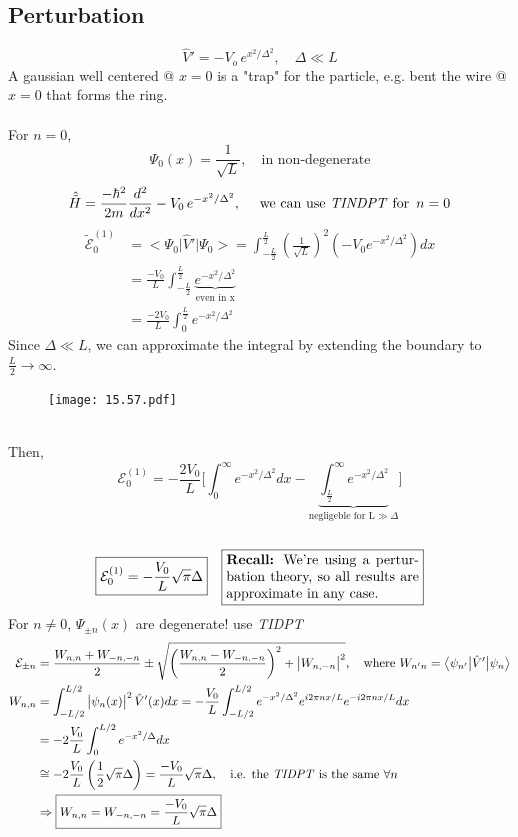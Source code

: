 \documentclass[12pt,fancychapters]{report}
\numberwithin{equation}{section}
\begin{document}
\subsection*{Perturbation}
\[
  \hat{V}' = -V_o\,e^{x^2/\Delta^2}, \quad \Delta \ll L
\]
A gaussian well centered @ $x=0$ is a "trap" for the particle, e.g. bent the wire @ $x=0$ that
forms the ring. \\
\\
For $n= 0$,
\[
  \Psi_0(x) = \frac{1}{\sqrt{L}}, \quad \text{in non-degenerate}
\]
\[
  \hat{ \tilde{H}} = \frac{-\hbar^2}{2m}\frac{d^2}{dx^2} - V_0\,e^{-x^2/\Delta^2}, \quad \text{
    we can use \emph{TINDPT} for
  }\,n=0
\]
\begin{align*}
  \tilde{\mathcal{E}}_0^{(1)} &=\big<\Psi_0\big|\hat{V}'\big|\Psi_0 \big> = \int_{-\frac{L}{2}}^
  {\frac{L}{2}}\left(\frac{1}{\sqrt{L}}\right)^2 \left(-V_0 e^{-x^2/\Delta^2}\right)dx\\
&= \frac{-V_0}{L}\int_{-\frac{L}{2}}^{\frac{L}{2}}\underbrace{e^{-x^2/\Delta^2}}_\text{even in x}\\
&=\frac{-2V_0}{L}\int_{0}^{\frac{L}{2}}e^{-x^2/\Delta^2} 
\end{align*}
Since $\Delta \ll L$, we can approximate the integral by extending the boundary to $\frac{L}{2}
\longrightarrow \infty$.
\begin{figure}
  \begin{center}
    \texttt{[image: 15.57.pdf]}
  \end{center}
\end{figure}
\\Then, 
\[\mathcal{E}^{(1)}_0 = -\frac{2V_0}{L}\Bigg[\int_{0}^{\infty} e^{-x^2/\Delta^2} dx
- \underbrace{\int_{\frac{L}{2}}^{\infty}e^{-x^2/\Delta^2}}_{\text{negligeble for L}\gg\Delta}
\Bigg]\]\\
\[
  \boxed{\mathcal{E}_0^{(1)} = -\frac{V_0}{L}\sqrt{\pi}\Delta}\quad
  \fbox{%
  \parbox{.4\textwidth}{%
  \textbf{Recall:} We're using a perturbation theory, so all results are 
  approximate in any case.
  }%
}
\]
For $n\neq 0$, $\Psi_{\pm n}(x)$ are degenerate! use \emph{TIDPT}
\begin{align*}
  \mathcal{E}_{\pm n} &=\frac{W_{n,n} +W_{-n,-n}}{2} \pm 
  \sqrt{\left(\frac{W_{n,n}
  - W_{-n,-n}}{2}\right)^2 + \big|W_{n, -n}\big|^2},\quad\text{where } W_{n'n} = 
  \big<\psi_{n'}\big|\hat{V}'\big|\psi_n\big>\\
  W_{n,n}&= \int_{-L/2}^{L/2}\big|\psi_n(x)\big|^2\, \hat{V}'(x)dx = -\frac{V_0}{L}\int_{-L/2}
  ^{L/2}e^{-x^2/\Delta^2}e^{i2\pi n x/L}e^{-i2\pi n x/L}dx\\
         &= -2\frac{V_0}{L}\int_{0}^{L/2} e^{-x^2/\Delta}dx\\
         &\cong -2\frac{V_0}{L}\left(\frac{1}{2}\sqrt{\pi}\Delta\right) = \frac{-V_0}{L}\sqrt
         {\pi}\Delta, \quad\text{i.e. the \emph{TIDPT} is the same }\forall n\\
         &\Rightarrow \boxed{W_{n,n}= W_{-n,-n} = \frac{-V_0}{L}\sqrt{\pi}\Delta}
\end{align*}
\end{document}
